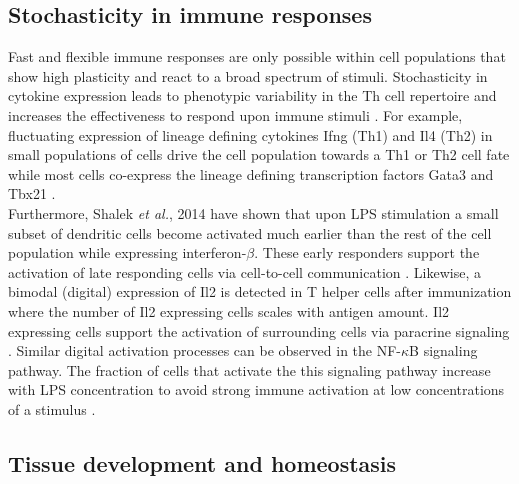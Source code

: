 \subsection{Stochasticity in immune responses}

Fast and flexible immune responses are only possible within cell populations that show high plasticity and react to a broad spectrum of stimuli. Stochasticity in cytokine expression leads to phenotypic variability in the \gls{Th} cell repertoire and increases the effectiveness to respond upon immune stimuli \citep{Schrom2017}. For example, fluctuating expression of lineage defining cytokines Ifng (Th1) and Il4 (Th2) in small populations of cells drive the cell population towards a Th1 or Th2 cell fate while most cells co-express the lineage defining transcription factors Gata3 and Tbx21 \citep{Fang2013a, Antebi2013}.\\

Furthermore, Shalek \textit{et al.}, 2014 have shown that upon LPS stimulation a small subset of dendritic cells become activated much earlier than the rest of the cell population while expressing interferon-$\beta$. These early responders support the activation of late responding cells via cell-to-cell communication \citep{Shalek2014}. Likewise, a bimodal (digital) expression of \gls{Il2} is detected in T helper cells after immunization where the number of Il2 expressing cells scales with antigen amount. Il2 expressing cells support the activation of surrounding cells via paracrine signaling \citep{Fuhrmann2016}. Similar digital activation processes can be observed in the NF-$\kappa$B signaling pathway. The fraction of cells that activate the this signaling pathway increase with LPS concentration to avoid strong immune activation at low concentrations of a stimulus \citep{Kellogg2015b}.


\subsection{Tissue development and homeostasis}


